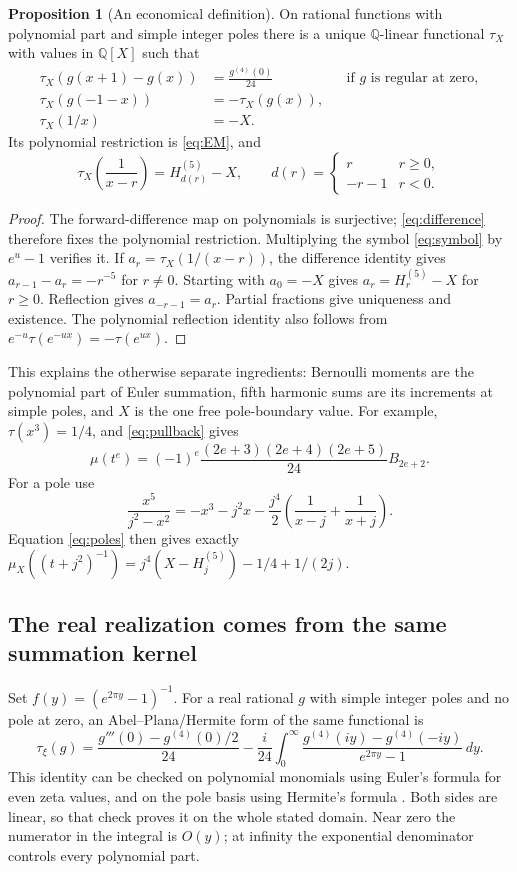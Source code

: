 \documentclass[11pt]{article}
\theoremstyle{definition}
\newtheorem{proposition}{Proposition}[section]
\theoremstyle{remark}\newtheorem*{remark}{Remark}
\newcommand{\Q}{\mathbb Q}
\newcommand{\dd}{\,d}
\begin{document}
\begin{proposition}[An economical definition]\label{prop:axioms}
On rational functions with polynomial part and simple integer poles there is a
unique $\Q$-linear functional $\tau_X$ with values in $\Q[X]$ such that
\begin{align}
 \tau_X(g(x+1)-g(x))&=\frac{g^{(4)}(0)}{24}
                  &&\text{if $g$ is regular at zero},\label{eq:difference}\\
 \tau_X(g(-1-x))&=-\tau_X(g(x)),\label{eq:reflection}\\
 \tau_X(1/x)&=-X.\label{eq:basepole}
\end{align}
Its polynomial restriction is \eqref{eq:EM}, and
\begin{equation}\label{eq:poles}
 \tau_X\!\left(\frac1{x-r}\right)=H^{(5)}_{d(r)}-X,
 \qquad d(r)=\begin{cases}r&r\ge0,\\-r-1&r<0.\end{cases}
\end{equation}
\end{proposition}
\begin{proof}
The forward-difference map on polynomials is surjective; \eqref{eq:difference}
therefore fixes the polynomial restriction. Multiplying the symbol
\eqref{eq:symbol} by $e^u-1$ verifies it. If
$a_r=\tau_X(1/(x-r))$, the difference identity gives
$a_{r-1}-a_r=-r^{-5}$ for $r\ne0$. Starting with $a_0=-X$ gives
$a_r=H_r^{(5)}-X$ for $r\ge0$. Reflection gives $a_{-r-1}=a_r$.
Partial fractions give uniqueness and existence. The polynomial reflection
identity also follows from $e^{-u}\tau(e^{-ux})=-\tau(e^{ux})$.
\end{proof}

This explains the otherwise separate ingredients: Bernoulli moments are the
polynomial part of Euler summation, fifth harmonic sums are its increments at
simple poles, and $X$ is the one free pole-boundary value. For example,
$\tau(x^3)=1/4$, and \eqref{eq:pullback} gives
\[
 \mu(t^e)=(-1)^e\frac{(2e+3)(2e+4)(2e+5)}{24}B_{2e+2}.
\]
For a pole use
\[
 \frac{x^5}{j^2-x^2}
 =-x^3-j^2x-\frac{j^4}{2}\left(\frac1{x-j}+\frac1{x+j}\right).
\]
Equation \eqref{eq:poles} then gives exactly
$\mu_X((t+j^2)^{-1})=j^4(X-H_j^{(5)})-1/4+1/(2j)$.

\subsection{The real realization comes from the same summation kernel}
Set $f(y)=(e^{2\pi y}-1)^{-1}$. For a real rational $g$ with simple integer
poles and no pole at zero, an Abel--Plana/Hermite form of the same functional is
\begin{equation}\label{eq:AP}
 \tau_\xi(g)=\frac{g'''(0)-g^{(4)}(0)/2}{24}
 -\frac{i}{24}\int_0^\infty
 \frac{g^{(4)}(iy)-g^{(4)}(-iy)}{e^{2\pi y}-1}\dd y.
\end{equation}
This identity can be checked on polynomial monomials using Euler's formula for
even zeta values, and on the pole basis using Hermite's formula
\cite{Hurwitz,Euler}. Both sides are linear, so that check proves it on the
whole stated domain. Near zero the numerator in the integral is $O(y)$; at
infinity the exponential denominator controls every polynomial part.
\end{document}

